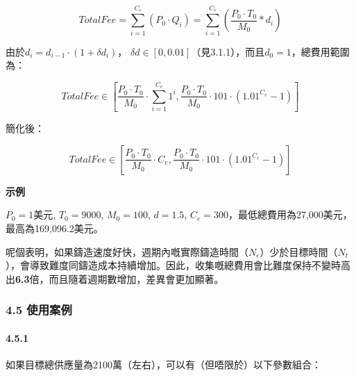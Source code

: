 \documentclass[
]{article}
\begin{document}
\begin{equation}
TotalFee = \sum_{i=1}^{C_e}(P_0 \cdot Q_i)=\sum_{i=1}^{C_e}(\frac{P_0 \cdot T_0}{M_0}*d_i)
\end{equation}

由於\(d_i = d_{i-1} \cdot (1 + \delta d_i)\)，
\(\delta d \in [0,0.01]\)（見3.1.1），而且\(d_0=1\)，總費用範圍為：

\begin{equation}
TotalFee \in [\frac{P_0 \cdot T_0}{M_0} \cdot \sum_{i=1}^{C_e}1^i, \frac{P_0 \cdot T_0}{M_0} \cdot 101 \cdot (1.01^{C_e}-1)]
\end{equation}

簡化後：

\begin{equation}
TotalFee \in [\frac{P_0 \cdot T_0}{M_0} \cdot C_e, \frac{P_0 \cdot T_0}{M_0} \cdot 101 \cdot (1.01^{C_e}-1)]
\end{equation}

\textbf{示例}

\(P_0=1\)美元, \(T_0=9000\), \(M_0=100\), \(d=1.5\),
\(C_e=300\)，最低總費用為27,000美元，最高為169,096.2美元。

呢個表明，如果鑄造速度好快，週期內嘅實際鑄造時間（\(N_e\)）少於目標時間（\(N_t\)），會導致難度同鑄造成本持續增加。因此，收集嘅總費用會比難度保持不變時高出\textbf{6.3}倍，而且隨着週期數增加，差異會更加顯著。

\subsubsection{4.5 使用案例}\label{ux4f7fux7528ux6848ux4f8b}

\paragraph{4.5.1}\label{section-3}

如果目標總供應量為2100萬（左右），可以有（但唔限於）以下參數組合：
\end{document}
